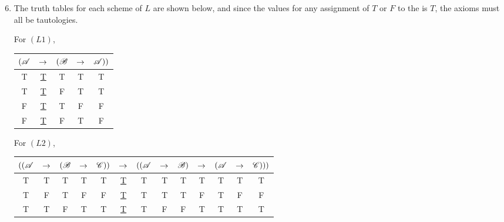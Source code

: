 \begin{enumerate}
  \setcounter{enumi}{5}
  \item %
    The truth tables for each scheme of \(L\) are shown below, and since the values for any assignment of \(T\) or \(F\) to the \wfs{} is \(T\), the axioms must all be tautologies.

    For \((L1)\),
    \begin{center}
      \begin{tabular}{ccccc}
        \((\mathscr{A}\)&
        \(\rightarrow\)&
        \((\mathscr{B}\)&
        \(\rightarrow\)&
        \(\mathscr{A}))\)\\\hline

        T&
        \underline{T}&
        T&
        T&
        T\\
        
        T&
        \underline{T}&
        F&
        T&
        T\\

        F&
        \underline{T}&
        T&
        F&
        F\\
        
        F&
        \underline{T}&
        F&
        T&
        F
      \end{tabular}
    \end{center}

    For \((L2)\),
    \begin{center}
      \begin{tabular}{ccccccccccccc}
        \(((\mathscr{A}\)&
        \(\rightarrow\)&
        \((\mathscr{B}\)&
        \(\rightarrow\)&
        \(\mathscr{C}))\)&
        \(\rightarrow\)&
        \(((\mathscr{A}\)&
        \(\rightarrow\)&
        \(\mathscr{B})\)&
        \(\rightarrow\)&
        \((\mathscr{A}\)&
        \(\rightarrow\)&
        \(\mathscr{C})))\)\\\hline

        T& %
        T& %
        T& %
        T& %
        T& %
        \underline{T}&
        T& %
        T& %
        T& %
        T& %
        T& %
        T& %
        T\\%

        T& %
        F& %
        T& %
        F& %
        F& %
        \underline{T}&
        T& %
        T& %
        T& %
        F& %
        T& %
        F& %
        F\\%

        T& %
        T& %
        F& %
        T& %
        T& %
        \underline{T}&
        T& %
        F& %
        F& %
        T& %
        T& %
        T& %
        T\\%


\end{tabular}
\end{center}
\end{enumerate}
